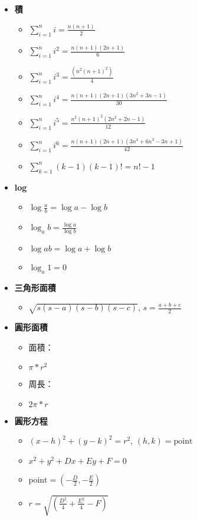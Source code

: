 \usepackage{amsmath}

\begin{itemize}
  \item \textbf{積}
  \begin{itemize}
    \item $\sum \limits_{i=1}^n i = \frac{n(n+1)}{2}$
    \item $\sum \limits_{i=1}^n i^2 = \frac{n(n+1)(2n+1)}{6}$
    \item $\sum \limits_{i=1}^n i^3 = \frac{(n^2(n+1)^2)}{4}$
    \item $\sum \limits_{i=1}^n i^4 = \frac{n(n+1)(2n+1)(3n^2+3n-1)}{30}$
    \item $\sum \limits_{i=1}^n i^5 = \frac{n^2(n+1)^2(2n^2+2n-1)}{12}$
    \item $\sum \limits_{i=1}^n i^6 = \frac{n(n+1)(2n+1)(3n^4+6n^3-3n+1)}{42}$
    \item $\sum \limits_{k=1}^n (k-1)(k-1)! = n!-1$
  \end{itemize}
  
  \item \textbf{log}
  \begin{itemize}
    \item $\log\frac{a}{b} = \log a - \log b$
    \item $\log_a b = \frac{\log a}{\log b}$
    \item $\log ab = \log a + \log b$
    \item $\log_a 1 = 0$
  \end{itemize}
  
  \item \textbf{三角形面積}
  \begin{itemize}
    \item $\sqrt{s(s-a)(s-b)(s-c)}$, $s = \frac{a+b+c}{2}$
  \end{itemize}

  \item \textbf{圓形面積}
  \begin{itemize}
    \item 面積：
    \item $\pi *r^2$
    \item 周長：
    \item $2\pi *r$
  \end{itemize}

  \item \textbf{圓形方程}
  \begin{itemize}
    \item $(x-h)^2+(y-k)^2 = r^2$, $(h, k) = \text{point}$
    \item $x^2 + y^2 + Dx + Ey + F = 0$
    \item $\text{point}=\left(-\frac{D}{2}, -\frac{E}{2}\right)$
    \item $r = \sqrt{\left(\frac{D^2}{4}+\frac{E^2}{4}-F\right)}$
  \end{itemize}


\end{itemize}
